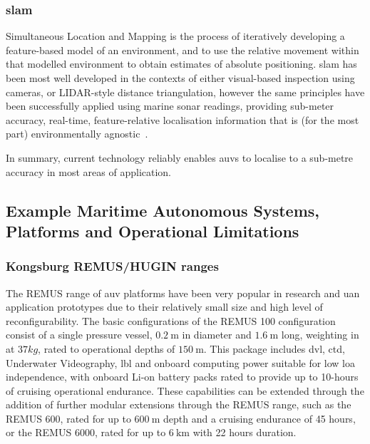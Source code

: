 \subsubsection{\gls{slam}}
Simultaneous Location and Mapping is the process of iteratively developing a feature-based model of an environment, and to use the relative movement within that modelled environment to obtain estimates of absolute positioning.
\gls{slam} has been most well developed in the contexts of either visual-based inspection using cameras, or LIDAR-style distance triangulation, however the same principles have been successfully applied using marine sonar readings, providing sub-meter accuracy, real-time, feature-relative localisation information that is (for the most part) environmentally agnostic~\cite{Williams2000}.

\vspace{\baselineskip}

In summary, current technology reliably enables \glspl{auv} to localise to a sub-metre accuracy in most areas of application.

\subsection{Example Maritime Autonomous Systems, Platforms and Operational Limitations}

\subsubsection{Kongsburg REMUS/HUGIN ranges}

The REMUS range of \gls{auv} platforms have been very popular in research and \gls{uan} application prototypes due to their relatively small size and high level of reconfigurability.
The basic configurations of the REMUS 100 configuration consist of a single pressure vessel, $\SI{0.2}{\meter}$ in diameter and $\SI{1.6}{\meter}$ long, weighting in at $37kg$, rated to operational depths of $\SI{150}{\meter}$. 
This package includes \gls{dvl}, \gls{ctd}, Underwater Videography, \gls{lbl} and onboard computing power suitable for low \gls{loa} independence, with onboard Li-on battery packs rated to provide up to 10-hours of cruising operational endurance.
These capabilities can be extended through the addition of further modular extensions through the REMUS range, such as the REMUS 600, rated for up to $\SI{600}{\meter}$ depth and a cruising endurance of 45 hours, or the REMUS 6000, rated for up to $\SI{6}{\kilo\meter}$ with 22 hours duration.

